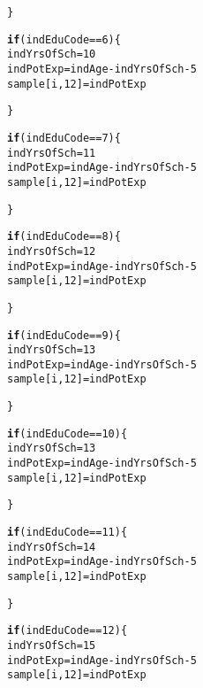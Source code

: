 \documentclass{article}\usepackage[]{graphicx}\usepackage[]{color}
\makeatletter
\newcommand{\hlnum}[1]{\textcolor[rgb]{0.686,0.059,0.569}{#1}}%
\newcommand{\hlopt}[1]{\textcolor[rgb]{0,0,0}{#1}}%
\newcommand{\hlstd}[1]{\textcolor[rgb]{0.345,0.345,0.345}{#1}}%
\newcommand{\hlkwa}[1]{\textcolor[rgb]{0.161,0.373,0.58}{\textbf{#1}}}%
\newcommand{\hlkwb}[1]{\textcolor[rgb]{0.69,0.353,0.396}{#1}}%
\newenvironment{kframe}{%
 \def\at@end@of@kframe{}%
 \ifinner\ifhmode%
  \def\at@end@of@kframe{\end{minipage}}%
  \begin{minipage}{\columnwidth}%
 \fi\fi%
 \def\FrameCommand##1{\hskip\@totalleftmargin \hskip-\fboxsep
 \colorbox{shadecolor}{##1}\hskip-\fboxsep
     \hskip-\linewidth \hskip-\@totalleftmargin \hskip\columnwidth}%
 \MakeFramed {\advance\hsize-\width
   \@totalleftmargin\z@ \linewidth\hsize
   \@setminipage}}%
 {\par\unskip\endMakeFramed%
 \at@end@of@kframe}
\newenvironment{knitrout}{}{} %
\makeatother
\begin{document}
\begin{knitrout}
\begin{kframe}
\begin{alltt}
    \hlstd{\}}

    \hlkwa{if} \hlstd{(indEduCode} \hlopt{==} \hlnum{6}\hlstd{)\{}
      \hlstd{indYrsOfSch} \hlkwb{=} \hlnum{10}
      \hlstd{indPotExp} \hlkwb{=} \hlstd{indAge} \hlopt{-} \hlstd{indYrsOfSch} \hlopt{-} \hlnum{5}
      \hlstd{sample[i,}\hlnum{12}\hlstd{]} \hlkwb{=} \hlstd{indPotExp}

    \hlstd{\}}

    \hlkwa{if} \hlstd{(indEduCode} \hlopt{==} \hlnum{7}\hlstd{)\{}
      \hlstd{indYrsOfSch} \hlkwb{=} \hlnum{11}
      \hlstd{indPotExp} \hlkwb{=} \hlstd{indAge} \hlopt{-} \hlstd{indYrsOfSch} \hlopt{-} \hlnum{5}
      \hlstd{sample[i,}\hlnum{12}\hlstd{]} \hlkwb{=} \hlstd{indPotExp}

    \hlstd{\}}

    \hlkwa{if} \hlstd{(indEduCode} \hlopt{==} \hlnum{8}\hlstd{)\{}
      \hlstd{indYrsOfSch} \hlkwb{=} \hlnum{12}
      \hlstd{indPotExp} \hlkwb{=} \hlstd{indAge} \hlopt{-} \hlstd{indYrsOfSch} \hlopt{-} \hlnum{5}
      \hlstd{sample[i,}\hlnum{12}\hlstd{]} \hlkwb{=} \hlstd{indPotExp}

    \hlstd{\}}

    \hlkwa{if} \hlstd{(indEduCode} \hlopt{==} \hlnum{9}\hlstd{)\{}
      \hlstd{indYrsOfSch} \hlkwb{=} \hlnum{13}
      \hlstd{indPotExp} \hlkwb{=} \hlstd{indAge} \hlopt{-} \hlstd{indYrsOfSch} \hlopt{-} \hlnum{5}
      \hlstd{sample[i,}\hlnum{12}\hlstd{]} \hlkwb{=} \hlstd{indPotExp}

    \hlstd{\}}

    \hlkwa{if} \hlstd{(indEduCode} \hlopt{==} \hlnum{10}\hlstd{)\{}
      \hlstd{indYrsOfSch} \hlkwb{=} \hlnum{13}
      \hlstd{indPotExp} \hlkwb{=} \hlstd{indAge} \hlopt{-} \hlstd{indYrsOfSch} \hlopt{-} \hlnum{5}
      \hlstd{sample[i,}\hlnum{12}\hlstd{]} \hlkwb{=} \hlstd{indPotExp}

    \hlstd{\}}

    \hlkwa{if} \hlstd{(indEduCode} \hlopt{==} \hlnum{11}\hlstd{)\{}
      \hlstd{indYrsOfSch} \hlkwb{=} \hlnum{14}
      \hlstd{indPotExp} \hlkwb{=} \hlstd{indAge} \hlopt{-} \hlstd{indYrsOfSch} \hlopt{-} \hlnum{5}
      \hlstd{sample[i,}\hlnum{12}\hlstd{]} \hlkwb{=} \hlstd{indPotExp}

    \hlstd{\}}

    \hlkwa{if} \hlstd{(indEduCode} \hlopt{==} \hlnum{12}\hlstd{)\{}
      \hlstd{indYrsOfSch} \hlkwb{=} \hlnum{15}
      \hlstd{indPotExp} \hlkwb{=} \hlstd{indAge} \hlopt{-} \hlstd{indYrsOfSch} \hlopt{-} \hlnum{5}
      \hlstd{sample[i,}\hlnum{12}\hlstd{]} \hlkwb{=} \hlstd{indPotExp}


\end{alltt}
\end{kframe}
\end{knitrout}
\end{document}
